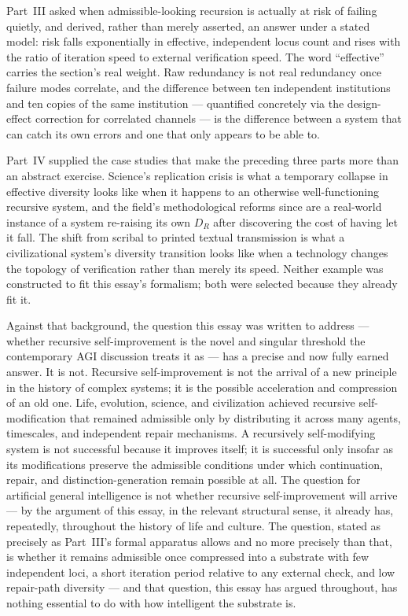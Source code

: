 \documentclass[11pt,a4paper]{article}
\theoremstyle{plain}
\theoremstyle{definition}
\theoremstyle{remark}
\newcommand{\DR}{D_R}
\begin{document}
Part~III asked when admissible-looking recursion is actually at risk of failing quietly, and derived, rather than merely asserted, an answer under a stated model: risk falls exponentially in effective, independent locus count and rises with the ratio of iteration speed to external verification speed. The word ``effective'' carries the section's real weight. Raw redundancy is not real redundancy once failure modes correlate, and the difference between ten independent institutions and ten copies of the same institution — quantified concretely via the design-effect correction for correlated channels — is the difference between a system that can catch its own errors and one that only appears to be able to.

Part~IV supplied the case studies that make the preceding three parts more than an abstract exercise. Science's replication crisis is what a temporary collapse in effective diversity looks like when it happens to an otherwise well-functioning recursive system, and the field's methodological reforms since are a real-world instance of a system re-raising its own $\DR$ after discovering the cost of having let it fall. The shift from scribal to printed textual transmission is what a civilizational system's diversity transition looks like when a technology changes the topology of verification rather than merely its speed. Neither example was constructed to fit this essay's formalism; both were selected because they already fit it.

Against that background, the question this essay was written to address — whether recursive self-improvement is the novel and singular threshold the contemporary AGI discussion treats it as — has a precise and now fully earned answer. It is not. Recursive self-improvement is not the arrival of a new principle in the history of complex systems; it is the possible acceleration and compression of an old one. Life, evolution, science, and civilization achieved recursive self-modification that remained admissible only by distributing it across many agents, timescales, and independent repair mechanisms. A recursively self-modifying system is not successful because it improves itself; it is successful only insofar as its modifications preserve the admissible conditions under which continuation, repair, and distinction-generation remain possible at all. The question for artificial general intelligence is not whether recursive self-improvement will arrive — by the argument of this essay, in the relevant structural sense, it already has, repeatedly, throughout the history of life and culture. The question, stated as precisely as Part~III's formal apparatus allows and no more precisely than that, is whether it remains admissible once compressed into a substrate with few independent loci, a short iteration period relative to any external check, and low repair-path diversity — and that question, this essay has argued throughout, has nothing essential to do with how intelligent the substrate is.
\end{document}
